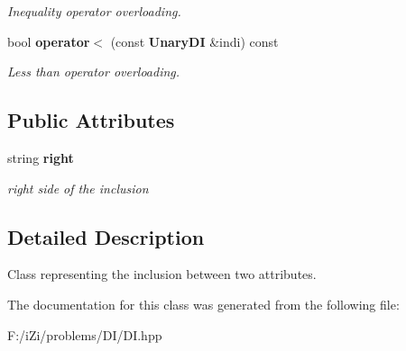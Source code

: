 \begin{CompactItemize}
\begin{CompactList}\small\item\em Inequality operator overloading. \item\end{CompactList}\item 
bool {\bf operator$<$} (const {\bf Unary\-DI} \&indi) const \label{class_unary_d_i_a3670e6107fd37d265011d718e26f928}

\begin{CompactList}\small\item\em Less than operator overloading. \item\end{CompactList}\end{CompactItemize}
\subsection*{Public Attributes}
\begin{CompactItemize}
\item 
string {\bf right}\label{class_unary_d_i_da750d668eb40e855943a023dbef1c18}

\begin{CompactList}\small\item\em right side of the inclusion \item\end{CompactList}\end{CompactItemize}


\subsection{Detailed Description}
Class representing the inclusion between two attributes. 



The documentation for this class was generated from the following file:\begin{CompactItemize}
\item 
F:/i\-Zi/problems/DI/DI.hpp\end{CompactItemize}

